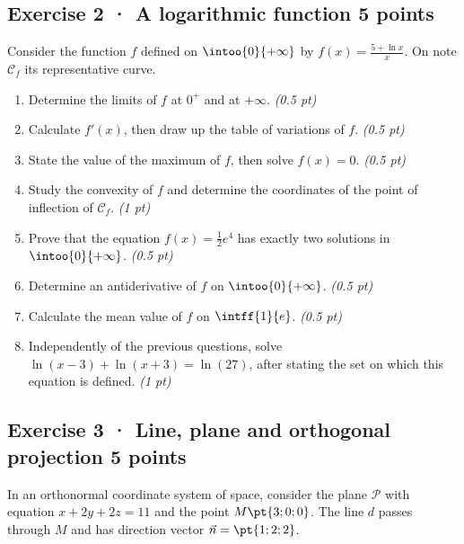 \subsection*{Exercise 2 · A logarithmic function \hfill 5 points}Consider the function $f$ defined on $\intoo{0}{+\infty}$ by $f(x)=\frac{5+\ln x}x$. On note $\mathcal C_f$ its representative curve.

\begin{enumerate}

\item Determine the limits of $f$ at $0^+$ and at $+\infty$. \hfill\textit{(0.5 pt)}

\item Calculate $f' (x)$, then draw up the table of variations of $f$. \hfill\textit{(0.5 pt)}

\item State the value of the maximum of $f$, then solve $f(x)=0$. \hfill\textit{(0.5 pt)}

\item Study the convexity of $f$ and determine the coordinates of the point of inflection of $\mathcal C_f$. \hfill\textit{(1 pt)}

\item Prove that the equation $f(x)=\frac12 e^{4}$ has exactly two solutions in $\intoo{0}{+\infty}$. \hfill\textit{(0.5 pt)}

\item Determine an antiderivative of $f$ on $\intoo{0}{+\infty}$. \hfill\textit{(0.5 pt)}

\item Calculate the mean value of $f$ on $\intff{1}{e}$. \hfill\textit{(0.5 pt)}

\item Independently of the previous questions, solve $\ln(x-3)+\ln(x+3)=\ln(27)$, after stating the set on which this equation is defined. \hfill\textit{(1 pt)}

\end{enumerate}

\mxnewpage{}

\subsection*{Exercise 3 · Line, plane and orthogonal projection \hfill 5 points}In an orthonormal coordinate system of space, consider the plane $\mathcal P$ with equation $x+2y+2z=11$ and the point $M\pt{3;0;0}$. The line $d$ passes through $M$ and has direction vector $\vec n=\pt{1;2;2}$.

